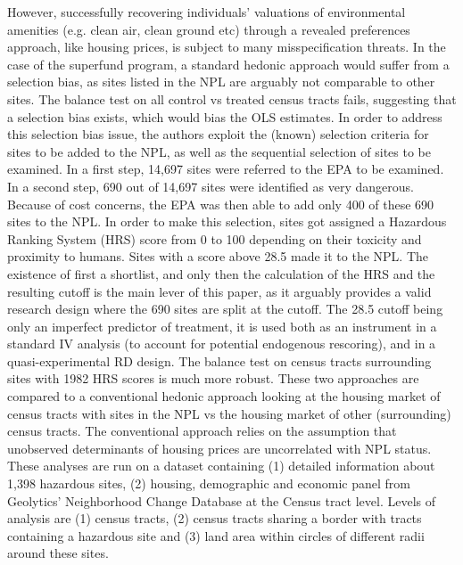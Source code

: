 \documentclass[12pt, final]{article}
\begin{document}
However, successfully recovering individuals’ valuations of environmental amenities (e.g. clean air, clean ground etc) through a revealed preferences approach, like housing prices, is subject to many misspecification threats. In the case of the superfund program, a standard hedonic approach would suffer from a selection bias, as sites listed in the NPL are arguably not comparable to other sites. The balance test on all control vs treated census tracts fails, suggesting that a selection bias exists, which would bias the OLS estimates.
In order to address this selection bias issue, the authors exploit the (known) selection criteria for sites to be added to the NPL, as well as the sequential selection of sites to be examined. In a first step, 14,697 sites were referred to the EPA to be examined. In a second step, 690 out of 14,697 sites were identified as very dangerous. Because of cost concerns, the EPA was then able to add only 400 of these 690 sites to the NPL. In order to make this selection, sites got assigned a Hazardous Ranking System (HRS) score from 0 to 100 depending on their toxicity and proximity to humans. Sites with a score above 28.5 made it to the NPL. 
The existence of first a shortlist, and only then the calculation of the HRS and the resulting cutoff is the main lever of this paper, as it arguably provides a valid research design where the 690 sites are split at the cutoff. The 28.5 cutoff being only an imperfect predictor of treatment, it is used both as an instrument in a standard IV analysis (to account for potential endogenous rescoring), and in a quasi-experimental RD design. The balance test on census tracts surrounding sites with 1982 HRS scores is much more robust.
These two approaches are compared to a conventional hedonic approach looking at the housing market of census tracts with sites in the NPL vs the housing market of other (surrounding) census tracts. The conventional approach relies on the assumption that unobserved determinants of housing prices are uncorrelated with NPL status.
\\

These analyses are run on a dataset containing (1) detailed information about 1,398 hazardous sites, (2) housing, demographic and economic panel from Geolytics’ Neighborhood Change Database at the Census tract level.
Levels of analysis are (1) census tracts, (2) census tracts sharing a border with tracts containing a hazardous site and (3) land area within circles of different radii around these sites.
\\
\end{document}
